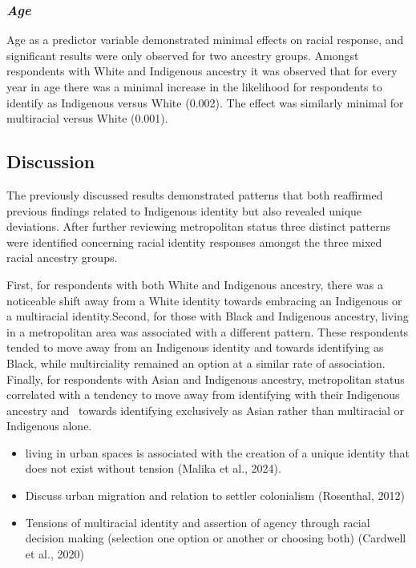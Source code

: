 \documentclass[
  12pt,
  letterpaper,
]{article}
\begin{document}
\subsubsection{\texorpdfstring{\emph{Age}}{Age}}\label{age}

Age as a predictor variable demonstrated minimal effects on racial
response, and significant results were only observed for two ancestry
groups. Amongst respondents with White and Indigenous ancestry it was
observed that for every year in age there was a minimal increase in the
likelihood for respondents to identify as Indigenous versus White
(0.002). The effect was similarly minimal for multiracial versus White
(0.001).

\subsection{Discussion}\label{discussion}

The previously discussed results demonstrated patterns that both
reaffirmed previous findings related to Indigenous identity but also
revealed unique deviations. After further reviewing metropolitan status
three distinct patterns were identified concerning racial identity
responses amongst the three mixed racial ancestry groups.

First, for respondents with both White and Indigenous ancestry, there
was a noticeable shift away from a White identity towards embracing an
Indigenous or a multiracial identity.Second, for those with Black and
Indigenous ancestry, living in a metropolitan area was associated with a
different pattern. These respondents tended to move away from an
Indigenous identity and towards identifying as Black, while
multirciality remained an option at a similar rate of association.
Finally, for respondents with Asian and Indigenous ancestry,
metropolitan status correlated with a tendency to move away from
identifying with their Indigenous ancestry and~ towards identifying
exclusively as Asian rather than multiracial or Indigenous alone.

\begin{itemize}
\item
  living in urban spaces is associated with the creation of a unique
  identity that does not exist without tension (Malika et al., 2024).
\item
  Discuss urban migration and relation to settler colonialism
  (Rosenthal, 2012)
\item
  Tensions of multiracial identity and assertion of agency through
  racial decision making (selection one option or another or choosing
  both) (Cardwell et al., 2020)
\end{itemize}
\end{document}
